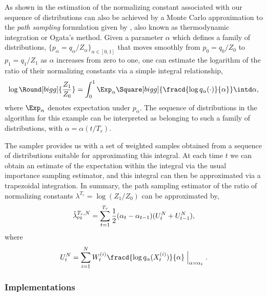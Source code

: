 \documentclass[11pt, fontset=Minion, showoverfull,
bib, mintcode, minted=cache]{marticle}
\begin{document}
As shown in \textcite{Zhou2013mc} the estimation of the normalizing constant
associated with our sequence of distributions can also be achieved by a Monte
Carlo approximation to the \emph{path sampling} formulation given by
\textcite{Gelman:1998ei}, also known as thermodynamic integration or Ogata's
method. Given a parameter $\alpha$ which defines a family of distributions,
$\{p_{\alpha} = q_{\alpha} / Z_\alpha\}_{\alpha \in [0,1]}$ that moves
smoothly from $p_0 = q_0 / Z_0$ to $p_1 = q_1 / Z_1$ as $\alpha$ increases
from zero to one, one can estimate the logarithm of the ratio of their
normalizing constants via a simple integral relationship,
\begin{equation}
  \log\Round[bigg]{\frac{Z_1}{Z_0}} = \int_{0}^{1} \Exp_\alpha
  \Square[bigg]{\fracd{\log q_{\alpha}(\cdot)}{\alpha}} \intd\alpha,
  \label{eq:path_identity}
\end{equation}
where $\Exp_\alpha$ denotes expectation under $p_\alpha$. The sequence of
distributions in the \smc algorithm for this example can be interpreted as
belonging to such a family of distributions, with $\alpha = \alpha(t/T_r)$.

The \smc sampler provides us with a set of weighted samples obtained from a
sequence of distributions suitable for approximating this integral. At each
time $t$ we can obtain an estimate of the expectation within the integral via
the usual importance sampling estimator, and this integral can then be
approximated via a trapezoidal integration. In summary, the path sampling
estimator of the ratio of normalizing constants $\lambda^{T_r} =
\log(Z_1/Z_0)$ can be approximated by,
\begin{equation}
  \hat\lambda_{\text{\textsc{ps}}}^{T_r,N} = \sum_{t=1}^{T_r}
  \frac{1}{2}(\alpha_t - \alpha_{t - 1})(U_t^N + U_{t-1}^N),
  \label{eq:path_est}
\end{equation}
where
\begin{equation}
  U_t^N = \sum_{i=1}^N
  W_t^{(i)} \fracd{\log q_{\alpha}(X_t^{(i)})}{\alpha}
  \Bigm|_{\alpha = \alpha_t}.
  \label{eq:path_import}
\end{equation}

\subsubsection{Implementations}
\end{document}
